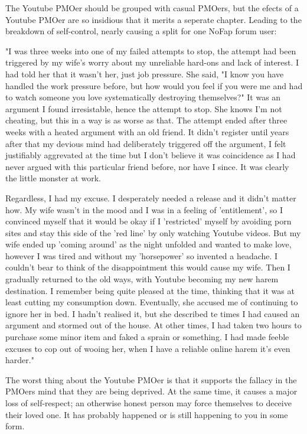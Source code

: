 \documentclass[easypeasy.tex]{subfiles}
\begin{document}
The Youtube PMOer should be grouped with casual PMOers, but the efects of a Youtube PMOer are so insidious that it merits a seperate chapter. Leading to the breakdown of self-control, nearly causing a split for one NoFap forum user:

"I was three weeks into one of my failed attempts to stop, the attempt had been triggered by my wife's worry about my unreliable hard-ons and lack of interest. I had told her that it wasn't her, just job pressure. She said, "I know you have handled the work pressure before, but how would you feel if you were me and had to watch someone you love systematically destroying themselves?" It was an argument I found irresistable, hence the attempt to stop. She knows I'm not cheating, but this in a way is as worse as that. The attempt ended after three weeks with a heated argument with an old friend. It didn't register until years after that my devious mind had deliberately triggered off the argument, I felt justifiably aggrevated at the time but I don't believe it was coincidence as I had never argued with this particular friend before, nor have I since. It was clearly the little monster at work.

  Regardless, I had my excuse. I desperately needed a release and it didn't matter how. My wife wasn't in the mood and I was in a feeling of 'entitlement', so I convinced myself that it would be okay if I 'restricted' myself by avoiding porn sites and stay this side of the 'red line' by only watching Youtube videos. But my wife ended up 'coming around' as the night unfolded and wanted to make love, however I was tired and without my 'horsepower' so invented a headache. I couldn't bear to think of the disappointment this would cause my wife. Then I gradually returned to the old ways, with Youtube becoming my new harem destination. I remember being quite pleased at the time, thinking that it was at least cutting my consumption down. Eventually, she accused me of continuing to ignore her in bed. I hadn't realised it, but she described te times I had caused an argument and stormed out of the house. At other times, I had taken two hours to purchase some minor item and faked a sprain or something. I had made feeble excuses to cop out of wooing her, when I have a reliable online harem it's even harder."

The worst thing about the Youtube PMOer is that it supports the fallacy in the PMOers mind that they are being deprived. At the same time, it causes a major loss of self-respect; an otherwise honest person may force themselves to deceive their loved one. It has probably happened or is still happening to you in some form.
\end{document}
